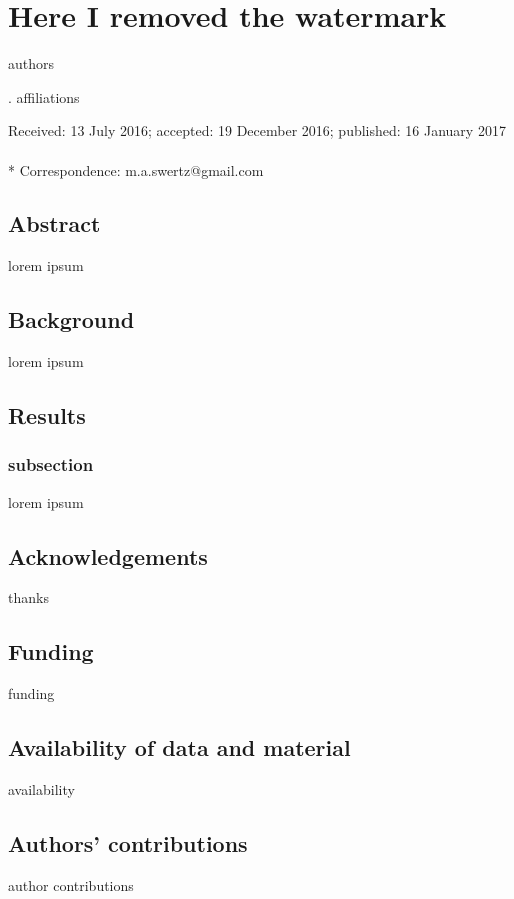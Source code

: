 \chapter[This is another example chapter]{Here I removed the watermark}
\label{chap:example}



\newpage

\noindent
authors

. affiliations

\noindent
Received: 13 July 2016; accepted: 19 December 2016; published: 16 January 2017
\\~\\
* Correspondence: m.a.swertz@gmail.com

\section*{Abstract}

lorem ipsum

\section{Background}

lorem ipsum


\section{Results}

\subsection{subsection}
lorem ipsum



\section*{Acknowledgements}
thanks

\section*{Funding}
funding

\section*{Availability of data and material}
availability

\section*{Authors’ contributions}
author contributions

